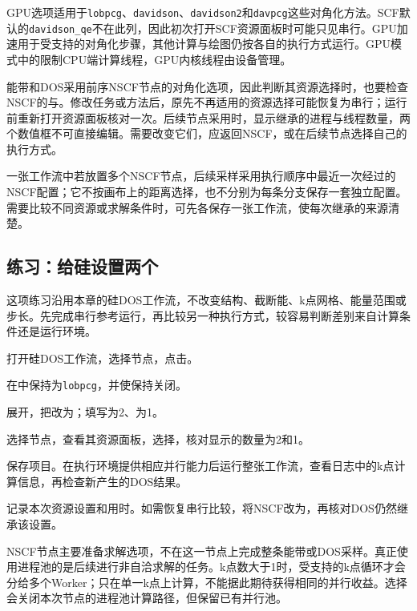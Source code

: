 GPU选项适用于\texttt{lobpcg}、\texttt{davidson}、\texttt{davidson2}和\texttt{davpcg}这些对角化方法。SCF默认的\texttt{davidson\_qe}不在此列，因此初次打开SCF资源面板时可能只见串行。GPU加速用于受支持的对角化步骤，其他计算与绘图仍按各自的执行方式运行。GPU模式中的限制CPU端计算线程，GPU内核线程由设备管理。

能带和DOS采用前序NSCF节点的对角化选项，因此判断其资源选择时，也要检查NSCF的与。修改任务或方法后，原先不再适用的资源选择可能恢复为串行；运行前重新打开资源面板核对一次。后续节点采用时，显示继承的进程与线程数量，两个数值框不可直接编辑。需要改变它们，应返回NSCF，或在后续节点选择自己的执行方式。

一张工作流中若放置多个NSCF节点，后续采样采用执行顺序中最近一次经过的NSCF配置；它不按画布上的距离选择，也不分别为每条分支保存一套独立配置。需要比较不同资源或求解条件时，可先各保存一张工作流，使每次继承的来源清楚。

\subsection{练习：给硅设置两个}

这项练习沿用本章的硅DOS工作流，不改变结构、截断能、k点网格、能量范围或步长。先完成串行参考运行，再比较另一种执行方式，较容易判断差别来自计算条件还是运行环境。

\begin{steps}
\item 打开硅DOS工作流，选择节点，点击。
\item 在中保持为\texttt{lobpcg}，并使保持关闭。
\item 展开，把改为；填写为2、为1。
\item 选择节点，查看其资源面板，选择，核对显示的数量为2和1。
\item 保存项目。在执行环境提供相应并行能力后运行整张工作流，查看日志中的k点计算信息，再检查新产生的DOS结果。
\item 记录本次资源设置和用时。如需恢复串行比较，将NSCF改为，再核对DOS仍然继承该设置。
\end{steps}

NSCF节点主要准备求解选项，不在这一节点上完成整条能带或DOS采样。真正使用进程池的是后续进行非自洽求解的任务。k点数大于1时，受支持的k点循环才会分给多个Worker；只在单一k点上计算，不能据此期待获得相同的并行收益。选择会关闭本次节点的进程池计算路径，但保留已有并行池。

